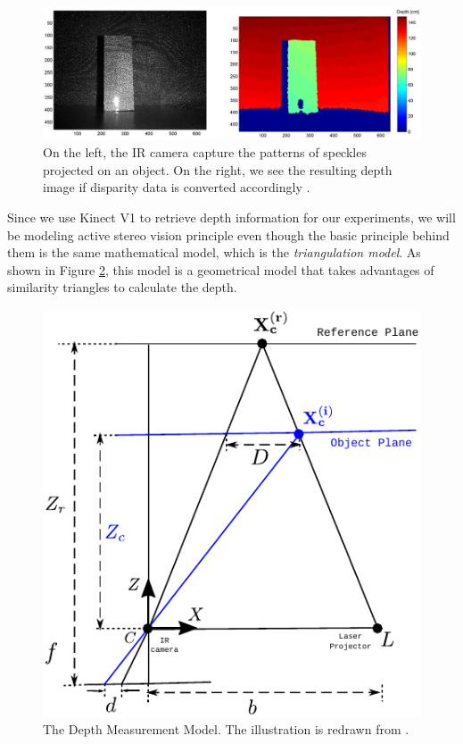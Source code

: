 \documentclass[a4paper]{report}
\numberwithin{figure}{section}
\begin{document}
\begin{figure}[H]
	\centering
  \includegraphics[width=0.7\linewidth,natwidth=640,natheight=640]
  {fig/ref_imgs/kinect_depth_img.png}
  \caption[Kinect's Depth Measurement]{On the left, the IR camera capture the 
  patterns of speckles projected on an object. On the right, we see the 
  resulting depth image if disparity data is converted accordingly 
  \parencite{Khoshelham2012a}.}
	\label{fig:kinect_depth_img}
\end{figure}

Since we use Kinect V1 to retrieve depth information for our experiments, we will 
be modeling active stereo vision principle even though the basic principle 
behind them is the same mathematical model, which is the \textit{triangulation 
model}. As shown in Figure \ref{fig:triangulation_model}, this model is a 
geometrical model that takes advantages of similarity triangles to calculate 
the depth.

\begin{figure}[H]
	\centering
  \includegraphics[width=0.65\linewidth,natwidth=640,natheight=640]
  {fig/drawings/triangulation.pdf}
  \caption[The Depth Measurement Model]{The Depth Measurement Model. The 
  illustration is redrawn from \parencite{Khoshelham2012a}.}
	\label{fig:triangulation_model}
\end{figure}
\end{document}
